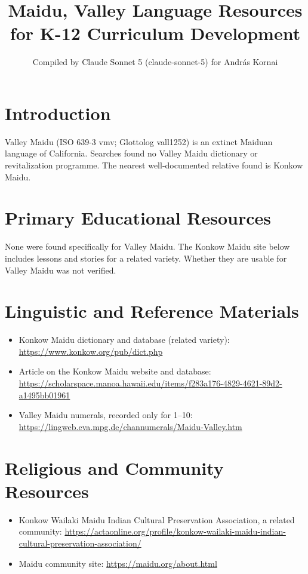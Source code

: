 \documentclass[12pt]{article}
\title{Maidu, Valley Language Resources for K-12 Curriculum Development}
\author{Compiled by Claude Sonnet 5 (claude-sonnet-5) for Andr\'as Kornai}
\date{}
\begin{document}
\maketitle

\section{Introduction}
Valley Maidu (ISO 639-3 vmv; Glottolog vall1252) is an extinct Maiduan language of California. Searches found no Valley Maidu dictionary or revitalization programme. The nearest well-documented relative found is Konkow Maidu.

\section{Primary Educational Resources}
None were found specifically for Valley Maidu. The Konkow Maidu site below includes lessons and stories for a related variety. Whether they are usable for Valley Maidu was not verified.

\section{Linguistic and Reference Materials}
\begin{itemize}
\item Konkow Maidu dictionary and database (related variety): \url{https://www.konkow.org/pub/dict.php}
\item Article on the Konkow Maidu website and database: \url{https://scholarspace.manoa.hawaii.edu/items/f283a176-4829-4621-89d2-a1495bb01961}
\item Valley Maidu numerals, recorded only for 1--10: \url{https://lingweb.eva.mpg.de/channumerals/Maidu-Valley.htm}
\end{itemize}

\section{Religious and Community Resources}
\begin{itemize}
\item Konkow Wailaki Maidu Indian Cultural Preservation Association, a related community: \url{https://actaonline.org/profile/konkow-wailaki-maidu-indian-cultural-preservation-association/}
\item Maidu community site: \url{https://maidu.org/about.html}
\end{itemize}
\end{document}
